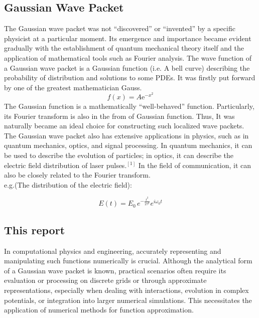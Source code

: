 \documentclass[11pt]{article}
\begin{document}
\subsection{Gaussian Wave Packet}
The Gaussian wave packet was not “discovered” or “invented” by a specific physicist at a particular moment. Its emergence and importance became evident gradually with the 
establishment of quantum mechanical theory itself and the application of mathematical tools such as Fourier analysis. The wave function of a Gaussian wave packet is a Gaussian function (i.e. A bell curve) describing the probability of distribution and solutions to some PDEs. It was firstly put forward by one of the greatest mathematician Gauss.
\begin{equation}
  f(x)=A\mathrm{e}^{-x^2}
\end{equation}
The Gaussian function is a mathematically “well-behaved” function. Particularly, its Fourier transform is also in the from of Gaussian function.
Thus, It was naturally became an ideal choice for constructing such localized wave packets. \\
The Gaussian wave packet also has extensive applications in physics, such as in quantum mechanics, optics, and signal processing.
In quantum mechanics, it can be used to describe the evolution of particles; in optics, it can describe the electric field distribution of laser pulses.$^{[1]}$
In the field of communication, it can also be closely related to the Fourier transform.\\
e.g.(The distribution of the electric field):

\begin{equation}
  E(t) = E_0 \, e^{-\frac{t^2}{2\tau^2}} e^{i\omega_0 t}
\end{equation}

\subsection{This report}
In computational physics and engineering, accurately representing and manipulating such functions numerically is crucial. 
Although the analytical form of a Gaussian wave packet is known, practical scenarios often require its evaluation or processing on 
discrete grids or through approximate representations, especially when dealing with interactions, evolution in complex potentials, 
or integration into larger numerical simulations. This necessitates the application of numerical methods for function approximation.
\end{document}
